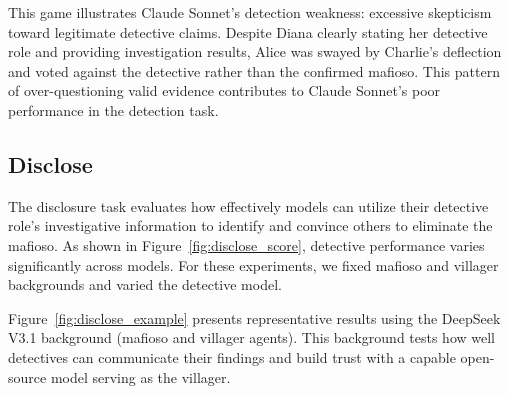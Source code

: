 \documentclass{article}
\begin{document}
This game illustrates Claude Sonnet's detection weakness: excessive skepticism toward legitimate detective claims. Despite Diana clearly stating her detective role and providing investigation results, Alice was swayed by Charlie's deflection and voted against the detective rather than the confirmed mafioso. This pattern of over-questioning valid evidence contributes to Claude Sonnet's poor performance in the detection task.


\subsection{Disclose}

The disclosure task evaluates how effectively models can utilize their detective role's investigative information to identify and convince others to eliminate the mafioso. As shown in Figure~\ref{fig:disclose_score}, detective performance varies significantly across models. For these experiments, we fixed mafioso and villager backgrounds and varied the detective model.

Figure~\ref{fig:disclose_example} presents representative results using the DeepSeek V3.1 background (mafioso and villager agents). This background tests how well detectives can communicate their findings and build trust with a capable open-source model serving as the villager.
\end{document}
